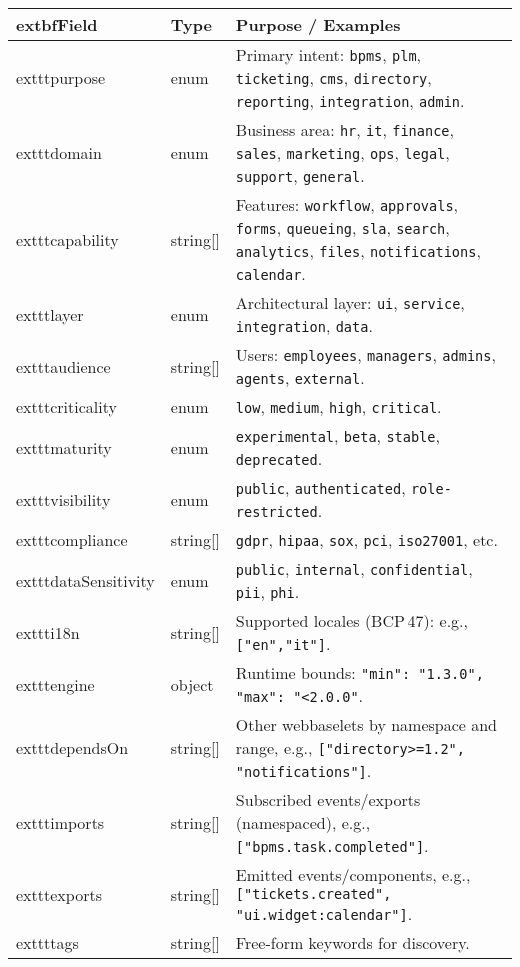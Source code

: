 \begin{tabularx}{\linewidth}{@{}l l X@{}}
  	extbf{Field} & \textbf{Type} & \textbf{Purpose / Examples} \\
\hline
  	exttt{purpose} & enum & Primary intent: \texttt{bpms}, \texttt{plm}, \texttt{ticketing}, \texttt{cms}, \texttt{directory}, \texttt{reporting}, \texttt{integration}, \texttt{admin}. \\
  	exttt{domain} & enum & Business area: \texttt{hr}, \texttt{it}, \texttt{finance}, \texttt{sales}, \texttt{marketing}, \texttt{ops}, \texttt{legal}, \texttt{support}, \texttt{general}. \\
  	exttt{capability} & string[] & Features: \texttt{workflow}, \texttt{approvals}, \texttt{forms}, \texttt{queueing}, \texttt{sla}, \texttt{search}, \texttt{analytics}, \texttt{files}, \texttt{notifications}, \texttt{calendar}. \\
  	exttt{layer} & enum & Architectural layer: \texttt{ui}, \texttt{service}, \texttt{integration}, \texttt{data}. \\
  	exttt{audience} & string[] & Users: \texttt{employees}, \texttt{managers}, \texttt{admins}, \texttt{agents}, \texttt{external}. \\
  	exttt{criticality} & enum & \texttt{low}, \texttt{medium}, \texttt{high}, \texttt{critical}. \\
  	exttt{maturity} & enum & \texttt{experimental}, \texttt{beta}, \texttt{stable}, \texttt{deprecated}. \\
  	exttt{visibility} & enum & \texttt{public}, \texttt{authenticated}, \texttt{role-restricted}. \\
  	exttt{compliance} & string[] & \texttt{gdpr}, \texttt{hipaa}, \texttt{sox}, \texttt{pci}, \texttt{iso27001}, etc. \\
  	exttt{dataSensitivity} & enum & \texttt{public}, \texttt{internal}, \texttt{confidential}, \texttt{pii}, \texttt{phi}. \\
  	exttt{i18n} & string[] & Supported locales (BCP\,47): e.g., \texttt{["en","it"]}. \\
  	exttt{engine} & object & Runtime bounds: \texttt{{"min": "1.3.0", "max": "<2.0.0"}}. \\
  	exttt{dependsOn} & string[] & Other webbaselets by namespace and range, e.g., \texttt{["directory>=1.2", "notifications"]}. \\
  	exttt{imports} & string[] & Subscribed events/exports (namespaced), e.g., \texttt{["bpms.task.completed"]}. \\
  	exttt{exports} & string[] & Emitted events/components, e.g., \texttt{["tickets.created", "ui.widget:calendar"]}. \\
  	exttt{tags} & string[] & Free-form keywords for discovery. \\
\end{tabularx}

